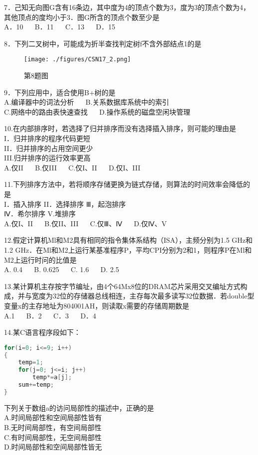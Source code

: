 7．己知无向图G含有16条边，其中度为4的顶点个数为3，度为3的顶点个数为4，其他顶点的度均小于3．图G所含的顶点个数至少是 \\
A．10  $\quad$  B．11  $\quad$  C．13  $\quad$  D．15

8．下列二叉树中，可能成为折半查找判定树f不含外部结点1的是 \\
\begin{figure}[ht]
\centering
\texttt{[image: ./figures/CSN17\_2.png]}
\caption{第8题图} \label{CSN17_fig2}
\end{figure}

9．下列应用中，适合使用B+树的是 \\
A.编译器中的词法分析 $\quad$ B.关系数据库系统中的索引 \\
C.网络中的路由表快速查找  $\quad$  D.操作系统的磁盘空闲块管理

10.在内部排序时，若选择了归并排序而没有选择插入排序，则可能的理由是 \\
I．归并排序的程序代码更短 \\
II．归并排序的占用空间更少 \\
III.归并排序的运行效率更高 \\
A.仅II  $\quad$  B.仅III  $\quad$  C.仅I、II  $\quad$  D.仅I、III

11.下列排序方法中，若将顺序存储更换为链式存储，则算法的时间效率会降低的是 \\
I．插入排序    II．选择排序  Ⅲ，起泡排序 \\
Ⅳ．希尔排序    V.堆排序 \\
A.仅I、II $\quad$ B.仅II、III  $\quad$  C.仅Ⅲ、Ⅳ  $\quad$  D.仅Ⅳ、V

12.假定计算机Ml和M2具有相同的指令集体系结构（ISA），主频分别为1.5 GHz和1.2 GHz．在Ml和M2上运行某基准程序P，平均CPI分别为2和1，则程序P在Ml和M2上运行时问的比值是 \\
A. 0.4  $\quad$  B. 0.625  $\quad$  C. 1.6  $\quad$  D. 2.5

13.某计算机主存按字节编址，由4个64Mx8位的DRAM芯片采用交叉编址方式构成，并与宽度为32位的存储器总线相连，主存每次最多读写32位数据．若double型变量x的主存地址为804001AH，则读取x需要的存储周期数是 \\
A.1  $\quad$  B．2  $\quad$  C．3  $\quad$  D．4

14.某C语言程序段如下： \\
\begin{lstlisting}[language=cpp]
for(i=0; i<=9; i++)
{
    temp=1;
    for(j=0; j<=i; j++)
        temp*=a[j];
    sum+=temp;
}
\end{lstlisting}
下列关于数组a的访问局部性的描述中，正确的是 \\
A.时间局部性和空间局部性皆有 \\
B.无时间局部性，有空间局部性 \\
C.有时间局部性，无空间局部性 \\
D.时间局部性和空间局部性皆无

